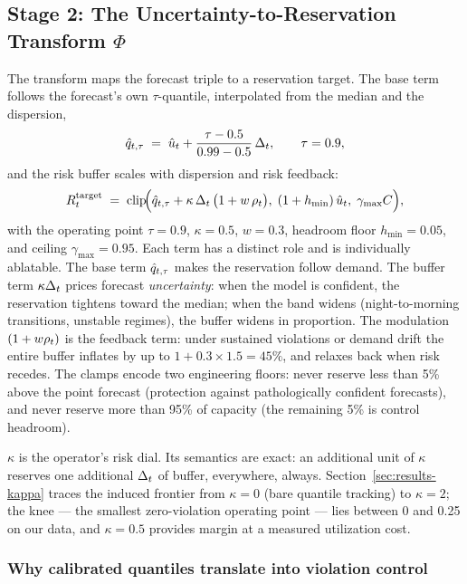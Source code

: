 \subsection{Stage 2: The Uncertainty-to-Reservation Transform
$\Phi$}
\label{sec:stage2}

The transform maps the forecast triple to a reservation target. The
base term follows the forecast's own $\tau$-quantile, interpolated
from the median and the dispersion,
\begin{equation}
\hat{q}_{t,\tau} \;=\; \hat{u}_t + \frac{\tau - 0.5}{0.99 - 0.5}\,\Delta_t,
\qquad \tau = 0.9,
\label{eq:qtau}
\end{equation}
and the risk buffer scales with dispersion and risk feedback:
\begin{equation}
R^{\text{target}}_t \;=\; \operatorname{clip}\!\Bigl(
\hat{q}_{t,\tau} + \kappa\,\Delta_t\,\bigl(1 + w\,\rho_t\bigr),\;
(1 + h_{\min})\,\hat{u}_t,\;
\gamma_{\max} C\Bigr),
\label{eq:phi}
\end{equation}
with the operating point $\tau = 0.9$, $\kappa = 0.5$, $w = 0.3$,
headroom floor $h_{\min} = 0.05$, and ceiling
$\gamma_{\max} = 0.95$. Each term has a distinct role and is
individually ablatable. The base term $\hat{q}_{t,\tau}$ makes the reservation
follow demand. The buffer term $\kappa \Delta_t$ prices forecast
\emph{uncertainty}: when the model is confident, the reservation
tightens toward the median; when the band widens (night-to-morning
transitions, unstable regimes), the buffer widens in proportion. The
modulation $(1 + w \rho_t)$ is the feedback term: under sustained
violations or demand drift the entire buffer inflates by up to
$1 + 0.3 \times 1.5 = 45\%$, and relaxes back when risk recedes. The
clamps encode two engineering floors: never reserve less than 5\%
above the point forecast (protection against pathologically confident
forecasts), and never reserve more than 95\% of capacity (the
remaining 5\% is control headroom).

$\kappa$ is the operator's risk dial. Its semantics are exact: an
additional unit of $\kappa$ reserves one additional $\Delta_t$ of
buffer, everywhere, always. Section~\ref{sec:results-kappa} traces
the induced frontier from $\kappa = 0$ (bare quantile tracking) to
$\kappa = 2$; the knee --- the smallest zero-violation operating
point --- lies between 0 and 0.25 on our data, and $\kappa = 0.5$
provides margin at a measured utilization cost.

\subsubsection{Why calibrated quantiles translate into violation
control}

